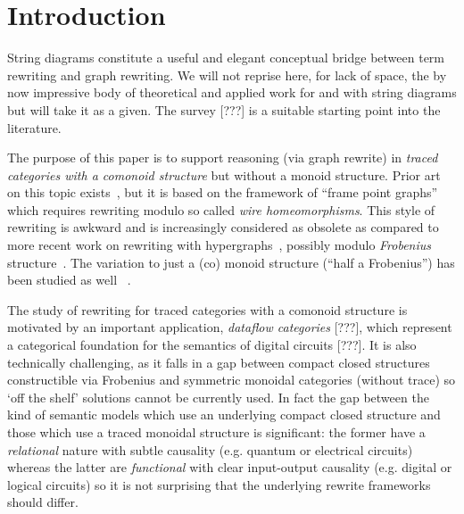 \section{Introduction}

String diagrams constitute a useful and elegant conceptual bridge between term rewriting and graph rewriting. We will not reprise here, for lack of space, the by now impressive body of theoretical and applied work for and with string diagrams but will take it as a given. The survey [???] is a suitable starting point into the literature. 

The purpose of this paper is to support reasoning (via graph rewrite) in \emph{traced categories with a comonoid structure} but without a monoid structure. Prior art on this topic exists~\cite{kissinger2012pictures,dixon2013opengraphs}, but it is based on the framework of ``frame point graphs'' which requires rewriting modulo so called \emph{wire homeomorphisms}. This style of rewriting is awkward and is increasingly considered as obsolete as compared to more recent work on rewriting with hypergraphs~\cite{bonchi2022stringa}, possibly modulo \emph{Frobenius} structure~\cite{bonchi2022string}. 
The variation to just a (co) monoid structure (``half a Frobenius'') has been studied as well~ \cite{fritz2022free,milosavljevic2022string}.

The study of rewriting for traced categories with a comonoid structure is motivated by an important application, \emph{dataflow categories} [???], which represent a categorical foundation for the semantics of digital circuits [???]. It is also technically challenging, as it falls in a gap between compact closed structures constructible via Frobenius and symmetric monoidal categories (without trace) so `off the shelf' solutions cannot be currently used. In fact the gap between the kind of semantic models which use an underlying compact closed structure and those which use a traced monoidal structure is significant: the former have a \emph{relational} nature with subtle causality (e.g. quantum or electrical circuits) whereas the latter are \emph{functional} with clear input-output causality (e.g. digital or logical circuits) so it is not surprising that the underlying rewrite frameworks should differ. 

